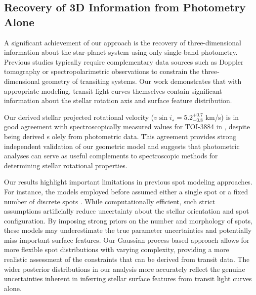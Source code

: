 \documentclass[twocolumn]{aastex631}
\begin{document}
\subsection{Recovery of 3D Information from Photometry Alone}

A significant achievement of our approach is the recovery of three-dimensional information about the star-planet system using 
only single-band photometry. Previous studies typically require complementary data sources such as Doppler tomography or 
spectropolarimetric observations to constrain the three-dimensional geometry of transiting systems. 
Our work demonstrates that with appropriate modeling, transit light curves themselves contain significant information about 
the stellar rotation axis and surface feature distribution.

Our derived stellar projected rotational velocity ($v\sin i_\star = {5.2}^{+0.7}_{-0.8}$ km/s) is in good agreement 
with spectroscopically measured values for TOI-3884 in \cite{Libby-Roberts2023}, despite being derived s
olely from photometric data. This agreement provides strong independent validation of our geometric model 
and suggests that photometric analyses can serve as useful complements to spectroscopic methods for determining stellar 
rotational properties.

Our results highlight important limitations in previous spot modeling approaches. For instance, 
the models employed before assumed either a single spot or a fixed number of discrete spots 
\citep{Morris2018,Oshagh2013,Libby-Roberts2023,Beky2014}. While computationally efficient, 
such strict assumptions artificially reduce uncertainty about the stellar orientation and spot configuration. 
By imposing strong priors on the number and morphology of spots, these models may underestimate the true parameter 
uncertainties and potentially miss important surface features.
Our Gaussian process-based approach allows for more flexible spot distributions with varying complexity, 
providing a more realistic assessment of the constraints that can be derived from transit data. 
The wider posterior distributions in our analysis more accurately reflect the genuine uncertainties inherent in 
inferring stellar surface features from transit light curves alone. 
\end{document}
